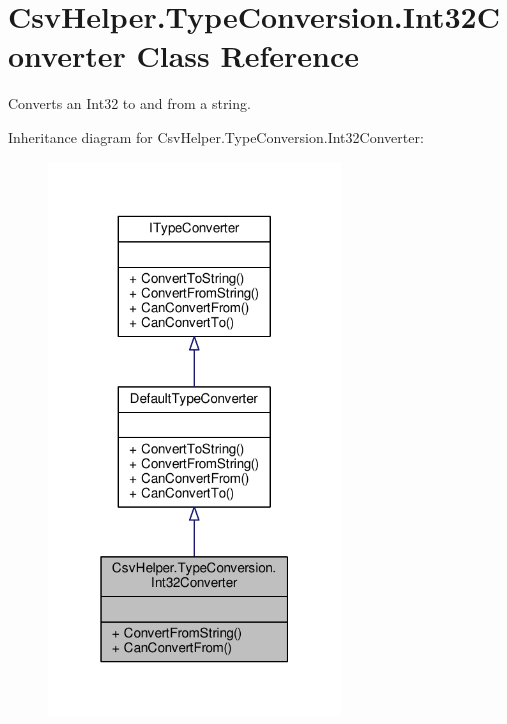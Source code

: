 \hypertarget{a00095}{\section{Csv\-Helper.\-Type\-Conversion.\-Int32\-Converter Class Reference}
\label{a00095}
}


Converts an Int32 to and from a string.  




Inheritance diagram for Csv\-Helper.\-Type\-Conversion.\-Int32\-Converter\-:
\nopagebreak
\begin{figure}[H]
\begin{center}
\leavevmode
\includegraphics[width=220pt]{dc/d8e/a00473}
\end{center}
\end{figure}


